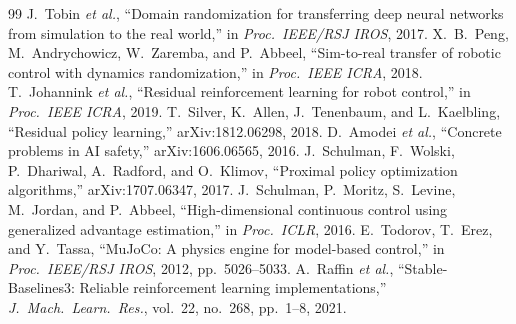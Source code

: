 \documentclass[conference]{IEEEtran}
\theoremstyle{remark}
\begin{document}
\begin{thebibliography}{99}
 J.~Tobin \emph{et al.}, ``Domain randomization for transferring deep neural networks from simulation to the real world,'' in \emph{Proc.\ IEEE/RSJ IROS}, 2017.
 X.~B.~Peng, M.~Andrychowicz, W.~Zaremba, and P.~Abbeel, ``Sim-to-real transfer of robotic control with dynamics randomization,'' in \emph{Proc.\ IEEE ICRA}, 2018.
 T.~Johannink \emph{et al.}, ``Residual reinforcement learning for robot control,'' in \emph{Proc.\ IEEE ICRA}, 2019.
 T.~Silver, K.~Allen, J.~Tenenbaum, and L.~Kaelbling, ``Residual policy learning,'' arXiv:1812.06298, 2018.
 D.~Amodei \emph{et al.}, ``Concrete problems in AI safety,'' arXiv:1606.06565, 2016.
 J.~Schulman, F.~Wolski, P.~Dhariwal, A.~Radford, and O.~Klimov, ``Proximal policy optimization algorithms,'' arXiv:1707.06347, 2017.
 J.~Schulman, P.~Moritz, S.~Levine, M.~Jordan, and P.~Abbeel, ``High-dimensional continuous control using generalized advantage estimation,'' in \emph{Proc.\ ICLR}, 2016.
 E.~Todorov, T.~Erez, and Y.~Tassa, ``MuJoCo: A physics engine for model-based control,'' in \emph{Proc.\ IEEE/RSJ IROS}, 2012, pp.~5026--5033.
 A.~Raffin \emph{et al.}, ``Stable-Baselines3: Reliable reinforcement learning implementations,'' \emph{J.\ Mach.\ Learn.\ Res.}, vol.~22, no.~268, pp.~1--8, 2021.
\end{thebibliography}
\end{document}
